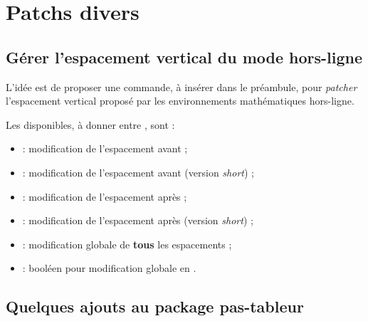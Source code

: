 \documentclass[french,11pt,a4paper]{article}
\begin{document}
\begin{DemoCode}{}
\end{DemoCode}

\pagebreak

\section{Patchs divers}

\subsection{Gérer l'espacement vertical du mode hors-ligne}

L'idée est de proposer une commande, à insérer dans le préambule, pour \textit{patcher} l'espacement vertical proposé par les environnements mathématiques hors-ligne.


Les  disponibles, à donner entre \MontreCode{[...]}, sont :

\begin{itemize}
	\item {} : modification de l'espacement avant ;
	\item {} : modification de l'espacement avant (version \textit{short}) ;
	\item {} : modification de l'espacement après ;
	\item {} : modification de l'espacement après (version \textit{short}) ;
	\item {} : modification globale de \textbf{tous} les espacements ;
	\item {} : booléen pour modification globale en .
\end{itemize}

\subsection{Quelques ajouts au package pas-tableur}
\end{document}
